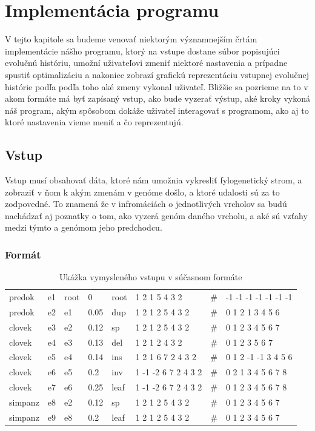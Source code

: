 \chapter{Implementácia programu}
V tejto kapitole sa budeme venovať niektorým významnejším črtám implementácie nášho programu, ktorý na vstupe dostane súbor popisujúci evolučnú históriu,
umožní uživateľovi zmeniť niektoré nastavenia a prípadne spustiť optimalizáciu a nakoniec zobrazí grafickú reprezentáciu vstupnej evolučnej histórie podľa
podľa toho aké zmeny vykonal uživateľ. Bližšie sa pozrieme na to v akom formáte má byť zapísaný vstup, ako bude vyzerať výstup, aké kroky vykoná náš program, akým spôsobom dokáže uživateľ interagovať s programom,
ako aj to ktoré nastavenia vieme meniť a čo reprezentujú.
\section{Vstup}
Vstup musí obsahovať dáta, ktoré nám umožnia vykresliť fylogenetický strom, a zobraziť v ňom k akým zmenám v genóme došlo, a ktoré udalosti sú za to zodpovedné.
To znamená že v infromáciách o jednotlivých vrcholov sa budú nachádzať aj poznatky o tom, ako vyzerá genóm daného vrcholu, a aké sú vzťahy medzi týmto a genómom jeho predchodcu.
\subsection{Formát}

\begin{table}[!htb]
\label{tab:vstup}
\begin{center}
\begin{tabular}{llllllll}
predok & e1 & root & 0 & root & 1 2 1 5 4 3 2 & \#  & -1 -1 -1 -1 -1 -1 -1 \\
predok & e2 & e1 &  0.05 & dup &  1 2 1 2 5 4 3 2 & \# & 0 1 2 1 3 4 5 6 \\
clovek & e3 & e2 &  0.12 & sp &   1 2 1 2 5 4 3 2 & \# & 0 1 2 3 4 5 6 7 \\
clovek & e4 & e3 &  0.13 & del & 1 2 1 2 4 3 2 & \# & 0 1 2 3 5 6 7 \\
clovek & e5 & e4 &  0.14 & ins & 1 2 1 6 7 2 4 3 2 & \# & 0 1 2 -1 -1 3 4 5 6 \\
clovek &  e6 & e5 &  0.2 & inv &  1 -1 -2 6 7 2 4 3 2 & \# & 0 2 1 3 4 5 6 7 8 \\
clovek & e7 & e6 &  0.25 & leaf & 1 -1 -2 6 7 2 4 3 2 & \# & 0 1 2 3 4 5 6 7 8 \\
simpanz & e8 & e2  & 0.12 & sp &  1 2 1 2 5 4 3 2 & \# & 0 1 2 3 4 5 6 7 \\
simpanz & e9 & e8 &  0.2 & leaf & 1 2 1 2 5 4 3 2 & \# & 0 1 2 3 4 5 6 7 \\
 \end{tabular}

\end{center}
\caption{Ukážka vymysleného vstupu v súčasnom formáte \cite{biowiki}}
\end{table}

